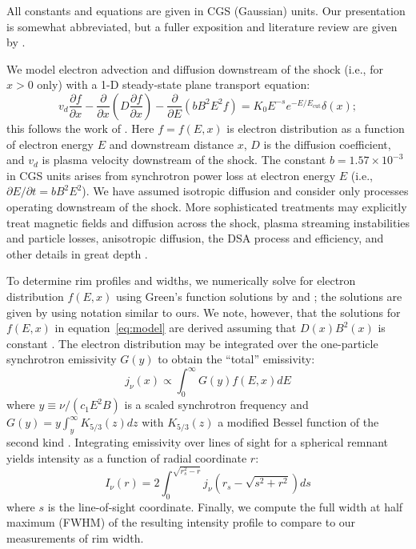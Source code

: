\documentclass[manuscript]{aastex}  %
\newcommand*{\mt}{\mathrm}
\newcommand*{\ptl}{\partial}
\newcommand*{\Ecut}{E_{\mt{cut}}}
\begin{document}
All constants and equations are given in CGS (Gaussian) units.  Our
presentation is somewhat abbreviated, but a fuller exposition and literature
review are given by .

We model electron advection and diffusion downstream of the shock (i.e., for
$x>0$ only) with a 1-D steady-state plane transport equation:
\begin{equation} \label{eq:model}
    v_d \frac{\ptl f}{\ptl x}
    - \frac{\ptl}{\ptl x} \left(D\frac{\ptl f}{\ptl x}\right)
    - \frac{\ptl}{\ptl E} \left(bB^2E^2f\right)
    = K_0 E^{-s} e^{-E/\Ecut} \delta(x) ;
\end{equation}
this follows the work of \citet{webb1984, berezhko2004, cassam-chenai2007,
morlino2010, rettig2012}.  Here $f = f(E,x)$ is electron distribution as a
function of electron energy $E$ and downstream distance $x$, $D$ is the
diffusion coefficient, and $v_d$ is plasma velocity downstream of the shock.
The constant $b = 1.57 \times 10^{-3}$ in CGS units arises from synchrotron
power loss at electron energy $E$ (i.e., $\ptl E/\ptl t = b B^2 E^2$).
We have assumed isotropic diffusion and consider only processes operating
downstream of the shock.  More sophisticated treatments may explicitly treat
magnetic fields and diffusion across the shock, plasma streaming instabilities
and particle losses, anisotropic diffusion, the DSA process and efficiency, and
other details in great depth \citep[e.g.,][and references therein]{reville2013,
bykov2014, ferrand2014}.

To determine rim profiles and widths, we numerically solve for electron
distribution $f(E,x)$ using Green's function solutions by \citet{lerche1980}
and \citet{rettig2012}; the solutions are given by 
using notation similar to ours.  We note, however, that the solutions for
$f(E,x)$ in equation~\eqref{eq:model} are derived assuming that $D(x) B^2(x)$
is constant \citep{lerche1980}.  The electron distribution may be integrated
over the one-particle synchrotron emissivity $G(y)$ to obtain the ``total''
emissivity:
\begin{equation} \label{eq:emissivity}
    j_{\nu}(x) \propto \int_0^\infty G(y) f(E,x) dE
\end{equation}
where $y \equiv \nu/(c_1 E^2 B)$ is a scaled synchrotron frequency and
$G(y) = y \int_y^\infty K_{5/3}(z) dz$ with $K_{5/3}(z)$ a modified Bessel
function of the second kind \citep{pacholczyk1970}.  Integrating emissivity
over lines of sight for a spherical remnant yields intensity as a function of
radial coordinate $r$:
\begin{equation} \label{eq:intensity}
    I_{\nu}(r) = 2 \int_0^{\sqrt{r_s^2 - r}}
                   j_{\nu} \left( r_s - \sqrt{s^2 + r^2} \right) ds
\end{equation}
where $s$ is the line-of-sight coordinate.  Finally, we compute the full width
at half maximum (FWHM) of the resulting intensity profile to compare to our
measurements of rim width.
\end{document}
